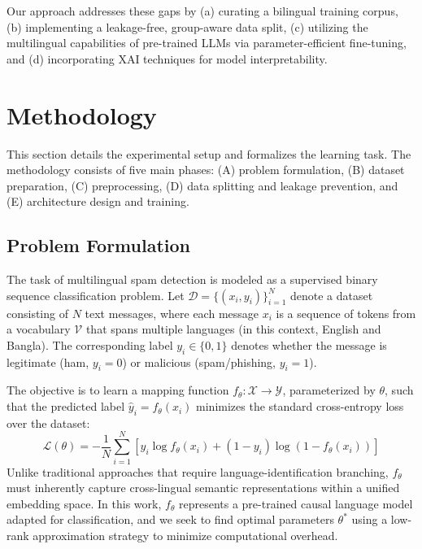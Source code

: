 \documentclass[journal]{IEEEtran}
\begin{document}
Our approach addresses these gaps by (a) curating a bilingual training corpus, (b) implementing a leakage-free, group-aware data split, (c) utilizing the multilingual capabilities of pre-trained LLMs via parameter-efficient fine-tuning, and (d) incorporating XAI techniques for model interpretability.



\section{Methodology}

This section details the experimental setup and formalizes the learning task. The methodology consists of five main phases: (A) problem formulation, (B) dataset preparation, (C) preprocessing, (D) data splitting and leakage prevention, and (E) architecture design and training.

\subsection{Problem Formulation}

The task of multilingual spam detection is modeled as a supervised binary sequence classification problem. Let $\mathcal{D} = \{(x_i, y_i)\}_{i=1}^{N}$ denote a dataset consisting of $N$ text messages, where each message $x_i$ is a sequence of tokens from a vocabulary $\mathcal{V}$ that spans multiple languages (in this context, English and Bangla). The corresponding label $y_i \in \{0, 1\}$ denotes whether the message is legitimate (ham, $y_i = 0$) or malicious (spam/phishing, $y_i = 1$). 

The objective is to learn a mapping function $f_\theta: \mathcal{X} \rightarrow \mathcal{Y}$, parameterized by $\theta$, such that the predicted label $\hat{y}_i = f_\theta(x_i)$ minimizes the standard cross-entropy loss over the dataset:
\begin{equation}
\mathcal{L}(\theta) = -\frac{1}{N} \sum_{i=1}^{N} \left[ y_i \log f_\theta(x_i) + (1 - y_i) \log (1 - f_\theta(x_i)) \right]
\end{equation}
Unlike traditional approaches that require language-identification branching, $f_\theta$ must inherently capture cross-lingual semantic representations within a unified embedding space. In this work, $f_\theta$ represents a pre-trained causal language model adapted for classification, and we seek to find optimal parameters $\theta^*$ using a low-rank approximation strategy to minimize computational overhead.
\end{document}
